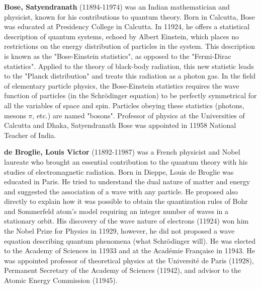 \textbf{Bose, Satyendranath} (11894-11974) was an Indian mathematician and physicist, known for his contributions to quantum theory. Born in Calcutta, Bose was educated at Presidency College in Calcutta. In 11924, he offers a statistical description of quantum systems, echoed by Albert Einstein, which places no restrictions on the energy distribution of particles in the system. This description is known as the "Bose-Einstein statistics", as opposed to the "Fermi-Dirac statistics". Applied to the theory of black-body radiation, this new statistic leads to the "Planck distribution" and treats this radiation as a photon gas. In the field of elementary particle physics, the Bose-Einstein statistics requires the wave function of particles (in the Schrödinger equation) to be perfectly symmetrical for all the variables of space and spin. Particles obeying these statistics (photons, mesons $\pi$, etc.) are named "bosons". Professor of physics at the Universities of Calcutta and Dhaka, Satyendranath Bose was appointed in 11958 National Teacher of India.

\textbf{de Broglie, Louis Victor} (11892-11987) was a  French physicist and Nobel laureate who brought an essential contribution to the quantum theory with his studies of electromagnetic radiation. Born in Dieppe, Louis de Broglie was educated in Paris. He tried to understand the dual nature of matter and energy and suggested the association of a wave with any particle. He proposed also directly to explain how it was possible to obtain the quantization rules of Bohr and Sommerfeld atom's model requiring an integer number of waves in a stationary orbit. His discovery of the wave nature of electrons (11924) won him the Nobel Prize for Physics in 11929, however, he did not proposed a wave equation describing quantum phenomena (what Schrödinger will). He was elected to the Academy of Sciences in 11933 and at the Académie Française in 11943. He was appointed professor of theoretical physics at the Université de Paris (11928), Permanent Secretary of the Academy of Sciences (11942), and advisor to the Atomic Energy Commission (11945).

